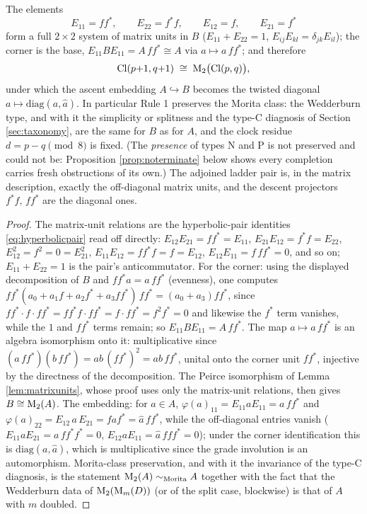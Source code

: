 \begin{theorem}\label{thm:morita}
The elements
\[
E_{11} = ff^*, \qquad E_{22} = f^*f, \qquad E_{12} = f, \qquad E_{21} = f^*
\]
form a full $2 \times 2$ system of matrix units in $B$ ($E_{11} + E_{22} = 1$, $E_{ij}E_{kl} = \delta_{jk}E_{il}$); the corner is the base, $E_{11} B E_{11} = A\,ff^* \cong A$ via $a \mapsto a\,ff^*$; and therefore
\[
\mathrm{Cl}(p{+}1, q{+}1) \;\cong\; \mathrm{M}_2\bigl(\mathrm{Cl}(p,q)\bigr),
\]
under which the ascent embedding $A \hookrightarrow B$ becomes the twisted diagonal $a \mapsto \mathrm{diag}(a, \hat{a})$. In particular Rule 1 preserves the Morita class: the Wedderburn type, and with it the simplicity or splitness and the type-C diagnosis of Section \ref{sec:taxonomy}, are the same for $B$ as for $A$, and the clock residue $d = p - q \pmod 8$ is fixed. (The \emph{presence} of types N and P is not preserved and could not be: Proposition \ref{prop:noterminate} below shows every completion carries fresh obstructions of its own.) The adjoined ladder pair is, in the matrix description, exactly the off-diagonal matrix units, and the descent projectors $f^*f,\, ff^*$ are the diagonal ones.
\end{theorem}

\begin{proof}
The matrix-unit relations are the hyperbolic-pair identities \eqref{eq:hyperbolicpair} read off directly: $E_{12}E_{21} = ff^* = E_{11}$, $E_{21}E_{12} = f^*f = E_{22}$, $E_{12}^2 = f^2 = 0 = E_{21}^2$, $E_{11}E_{12} = ff^*f = f = E_{12}$, $E_{12}E_{11} = f\,ff^* = 0$, and so on; $E_{11} + E_{22} = 1$ is the pair's anticommutator. For the corner: using the displayed decomposition of $B$ and $ff^* a = a\, ff^*$ (evenness), one computes $ff^* (a_0 + a_1 f + a_2 f^* + a_3 ff^*)\, ff^* = (a_0 + a_3) ff^*$, since $ff^* \cdot f \cdot ff^* = f f^* f \cdot f f^* = f \cdot ff^* = f^2 f^* = 0$ and likewise the $f^*$ term vanishes, while the $1$ and $ff^*$ terms remain; so $E_{11}BE_{11} = A\,ff^*$. The map $a \mapsto a\,ff^*$ is an algebra isomorphism onto it: multiplicative since $(a\,ff^*)(b\,ff^*) = ab\,(ff^*)^2 = ab\,ff^*$, unital onto the corner unit $ff^*$, injective by the directness of the decomposition. The Peirce isomorphism of Lemma \ref{lem:matrixunits}, whose proof uses only the matrix-unit relations, then gives $B \cong \mathrm{M}_2(A)$. The embedding: for $a \in A$, $\varphi(a)_{11} = E_{11} a E_{11} = a\,ff^*$ and $\varphi(a)_{22} = E_{12}\, a\, E_{21} = f a f^* = \hat{a}\, ff^*$, while the off-diagonal entries vanish ($E_{11} a E_{21} = a\, ff^*f^* = 0$, $E_{12} a E_{11} = \hat a\,f ff^* = 0$); under the corner identification this is $\mathrm{diag}(a, \hat{a})$, which is multiplicative since the grade involution is an automorphism. Morita-class preservation, and with it the invariance of the type-C diagnosis, is the statement $\mathrm{M}_2(A) \sim_{\text{Morita}} A$ together with the fact that the Wedderburn data of $\mathrm{M}_2(\mathrm{M}_m(D))$ (or of the split case, blockwise) is that of $A$ with $m$ doubled.
\end{proof}

